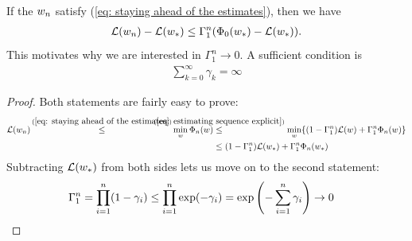 \begin{lemma}
	\label{lem: estimating sequence convergence speed}
	If the \(w_n\) satisfy (\ref{eq: staying ahead of the estimates}),
	then we have
	\begin{align*}
		\mathcal{L}(w_n) - \mathcal{L}(w_*)
		\le \Gamma_1^n (\Phi_0(w_*)-\mathcal{L}(w_*)).
	\end{align*}
	This motivates why we are interested in \(\Gamma_1^n\to 0\). A sufficient
	condition is
	\begin{align*}
		\sum_{k=0}^\infty \gamma_k = \infty
	\end{align*}
\end{lemma}
\begin{proof}
	Both statements are fairly easy to prove:
	\begin{align*}
		\Loss(\weights_n)
		\xle{(\ref{eq: staying ahead of the estimates})}
		\min_{\weights}\Phi_n(\weights)
		&\lxle{(\ref{eq: estimating sequence explicit})} \min_{\weights} \{
		(1-\Gamma_1^n) \Loss(\weights) + \Gamma_1^n\Phi_n(\weights) \}\\ 
		&\le (1-\Gamma_1^n) \Loss(\weights_*) + \Gamma_1^n\Phi_n(\weights_*)
	\end{align*}
	Subtracting \(\mathcal{L}(w_*)\) from both sides lets us move on to the
	second statement:
	\begin{align*}
		\Gamma_1^n &= \prod_{i=1}^n (1-\gamma_i)
		\le\prod_{i=1}^n \exp(-\gamma_i)
		= \exp\left(-\sum_{i=1}^n\gamma_i\right) \to 0
		\qedhere
	\end{align*}
\end{proof}

